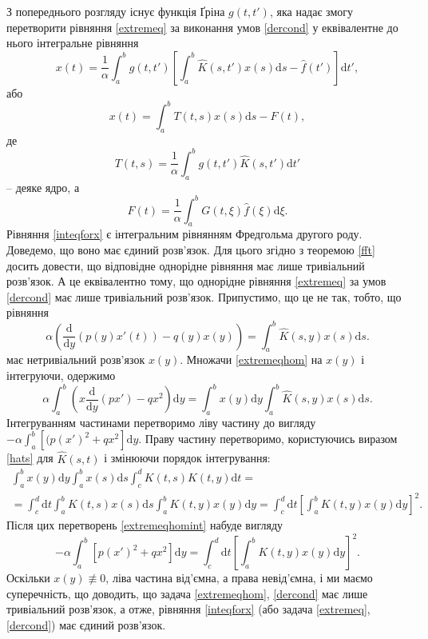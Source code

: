 \documentclass[14pt,twoside]{extreport}
\theoremstyle{mystyle}
\numberwithin{equation}{chapter}
\begin{document}
З попереднього розгляду існує функція Ґріна $g(t, t')$, яка надає змогу перетворити рівняння \eqref{extremeq} за виконання умов \eqref{dercond} у еквівалентне до нього інтегральне рівняння
$$
x(t)=\frac{1}{\alpha}\int_{a}^{b}g(t, t')\left[\int_{a}^{b}\hat{K}(s, t')x(s)\mathrm{d}s-\hat{f}(t')\right]\mathrm{d}t',
$$
або
\begin{equation}\label{inteqforx}
	x(t)=\displaystyle \int_a^b T(t, s)x(s)\mathrm{d}s-F(t),
\end{equation}
де
$$
T(t, s)=\frac{1}{\alpha}\int_{a}^{b}g(t, t')\hat{K}(s, t')\mathrm{d}t'
$$
-- деяке ядро, а
$$
F(t)=\frac{1}{\alpha}\int_a^b G(t, \xi)\hat{f}(\xi)\mathrm{d}\xi.
$$
Рівняння \eqref{inteqforx} є інтегральним рівнянням Фредгольма другого роду. Доведемо, що воно має єдиний розв'язок. Для цього згідно з теоремою \ref{fft} досить довести, що відповідне однорідне рівняння має лише тривіальний розв'язок. А це еквівалентно тому, що однорідне рівняння \eqref{extremeq} за умов \eqref{dercond} має лише тривіальний розв'язок. Припустимо, що це не так, тобто, що рівняння
\begin{equation}\label{extremeqhom}
\displaystyle \alpha\left(\frac{\mathrm{d}}{\mathrm{d}y}(p(y)x'(t))-q(y)x(y)\right)=\int_{a}^{b}\hat{K}(s, y)x(s)\mathrm{d}s.
\end{equation}
має нетривіальний розв'язок $x(y)$. Множачи \eqref{extremeqhom} на $x(y)$ і інтегруючи, одержимо
\begin{equation}\label{extremeqhomint}
\displaystyle \alpha\int_{a}^{b}\left(x\frac{\mathrm{d}}{\mathrm{d}y}(px')-qx^2\right)\mathrm{d}y=\int_{a}^{b}x(y)\mathrm{d}y\int_{a}^{b}\hat{K}(s, y)x(s)\mathrm{d}s.
\end{equation}
Інтегруванням частинами перетворимо ліву частину до вигляду
$-\displaystyle \alpha\int_{a}^{b}[(p(x')^{2}+qx^{2}]\mathrm{d}y$.
Праву частину перетворимо, користуючись виразом \eqref{hats} для $\hat{K}(s, t)$ і змінюючи порядок інтегрування:
\begin{multline*}
\int_{a}^{b}x(y)\mathrm{d}y\int_{a}^{b}x(s)\mathrm{d}s\int_{c}^{d}K(t, s)K(t, y)\mathrm{d}t=\\
=\displaystyle \int_{c}^{d}\mathrm{d}t \int_{a}^{b}K(t, s)x(s)\mathrm{d}s\int_{a}^{b}K(t, y)x(y)\mathrm{d}y = \int_{c}^{d}\mathrm{d}t\left[\int_{a}^{b}K(t, y)x(y)\mathrm{d}y\right]^2.
\end{multline*}
Після цих перетворень \eqref{extremeqhomint} набуде вигляду
$$
-\alpha\int_{a}^{b}[p(x')^{2}+qx^{2}]\mathrm{d}y=\int_{c}^{d}\mathrm{d}t\left[\int_{a}^{b}K(t, y)x(y)\mathrm{d}y\right]^2.
$$
Оскільки $x(y) \not\equiv 0$, ліва частина від'ємна, а права невід'ємна, і ми маємо суперечність, що доводить, що задача \eqref{extremeqhom}, \eqref{dercond} має лише тривіальний розв'язок, а отже, рівняння \eqref{inteqforx} (або задача \eqref{extremeq}, \eqref{dercond}) має єдиний розв'язок.
\end{document}
